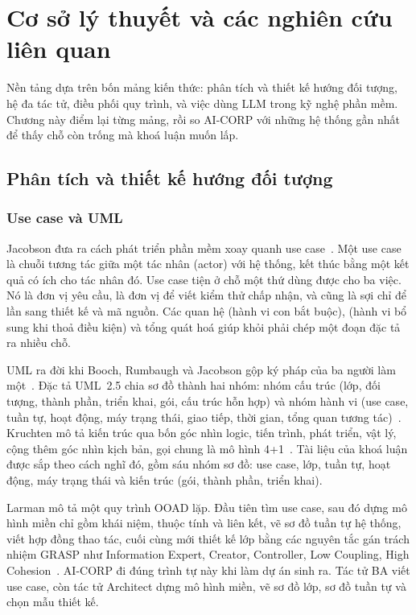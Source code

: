 \chapter{Cơ sở lý thuyết và các nghiên cứu liên quan}
\label{chap:co-so}

Nền tảng dựa trên bốn mảng kiến thức: phân tích và thiết kế hướng đối tượng, hệ đa tác tử, điều phối quy trình, và việc dùng LLM trong kỹ nghệ phần mềm. Chương này điểm lại từng mảng, rồi so AI-CORP với những hệ thống gần nhất để thấy chỗ còn trống mà khoá luận muốn lấp.

\section{Phân tích và thiết kế hướng đối tượng}

\subsection{Use case và UML}

Jacobson đưa ra cách phát triển phần mềm xoay quanh use case~\cite{jacobson1992}. Một use case là chuỗi tương tác giữa một tác nhân (actor) với hệ thống, kết thúc bằng một kết quả có ích cho tác nhân đó. Use case tiện ở chỗ một thứ dùng được cho ba việc. Nó là đơn vị yêu cầu, là đơn vị để viết kiểm thử chấp nhận, và cũng là sợi chỉ để lần sang thiết kế và mã nguồn. Các quan hệ  (hành vi con bắt buộc),  (hành vi bổ sung khi thoả điều kiện) và tổng quát hoá giúp khỏi phải chép một đoạn đặc tả ra nhiều chỗ.

UML ra đời khi Booch, Rumbaugh và Jacobson gộp ký pháp của ba người làm một~\cite{booch2005}. Đặc tả UML~2.5 chia sơ đồ thành hai nhóm: nhóm cấu trúc (lớp, đối tượng, thành phần, triển khai, gói, cấu trúc hỗn hợp) và nhóm hành vi (use case, tuần tự, hoạt động, máy trạng thái, giao tiếp, thời gian, tổng quan tương tác)~\cite{omg2017uml}. Kruchten mô tả kiến trúc qua bốn góc nhìn logic, tiến trình, phát triển, vật lý, cộng thêm góc nhìn kịch bản, gọi chung là mô hình 4+1~\cite{kruchten1995}. Tài liệu của khoá luận được sắp theo cách nghĩ đó, gồm sáu nhóm sơ đồ: use case, lớp, tuần tự, hoạt động, máy trạng thái và kiến trúc (gói, thành phần, triển khai).

Larman mô tả một quy trình OOAD lặp. Đầu tiên tìm use case, sau đó dựng mô hình miền chỉ gồm khái niệm, thuộc tính và liên kết, vẽ sơ đồ tuần tự hệ thống, viết hợp đồng thao tác, cuối cùng mới thiết kế lớp bằng các nguyên tắc gán trách nhiệm GRASP như Information Expert, Creator, Controller, Low Coupling, High Cohesion~\cite{larman2004}. AI-CORP đi đúng trình tự này khi làm dự án sinh ra. Tác tử BA viết use case, còn tác tử Architect dựng mô hình miền, vẽ sơ đồ lớp, sơ đồ tuần tự và chọn mẫu thiết kế.

